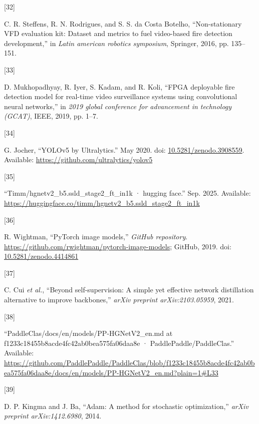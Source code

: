 \documentclass[
  10pt,
]{article}
\newlength{\cslhangindent}
\newlength{\csllabelwidth}
\newenvironment{CSLReferences}[2] %
 {\begin{list}{}{%
  \setlength{\itemindent}{0pt}
  \setlength{\leftmargin}{0pt}
  \setlength{\parsep}{0pt}
  \ifodd #1
   \setlength{\leftmargin}{\cslhangindent}
   \setlength{\itemindent}{-1\cslhangindent}
  \fi
  \setlength{\itemsep}{#2\baselineskip}}}
 {\end{list}}
\newcommand{\CSLLeftMargin}[1]{\parbox[t]{\csllabelwidth}{\strut#1\strut}}
\newcommand{\CSLRightInline}[1]{\parbox[t]{\linewidth - \csllabelwidth}{\strut#1\strut}}
\begin{document}
\begin{CSLReferences}{0}{0}
\CSLLeftMargin{{[}32{]} }%
\CSLRightInline{C. R. Steffens, R. N. Rodrigues, and S. S. da Costa
Botelho, {``Non-stationary VFD evaluation kit: Dataset and metrics to
fuel video-based fire detection development,''} in \emph{Latin american
robotics symposium}, Springer, 2016, pp. 135--151.}

\CSLLeftMargin{{[}33{]} }%
\CSLRightInline{D. Mukhopadhyay, R. Iyer, S. Kadam, and R. Koli, {``FPGA
deployable fire detection model for real-time video surveillance systems
using convolutional neural networks,''} in \emph{2019 global conference
for advancement in technology (GCAT)}, IEEE, 2019, pp. 1--7.}

\CSLLeftMargin{{[}34{]} }%
\CSLRightInline{G. Jocher, {``{YOLOv5 by Ultralytics}.''} May 2020. doi:
\href{https://doi.org/10.5281/zenodo.3908559}{10.5281/zenodo.3908559}.
Available: \url{https://github.com/ultralytics/yolov5}}

\CSLLeftMargin{{[}35{]} }%
\CSLRightInline{{``Timm/hgnetv2\_b5.ssld\_stage2\_ft\_in1k · hugging
face.''} Sep. 2025. Available:
\url{https://huggingface.co/timm/hgnetv2_b5.ssld_stage2_ft_in1k}}

\CSLLeftMargin{{[}36{]} }%
\CSLRightInline{R. Wightman, {``PyTorch image models,''} \emph{GitHub
repository}. \url{https://github.com/rwightman/pytorch-image-models};
GitHub, 2019. doi:
\href{https://doi.org/10.5281/zenodo.4414861}{10.5281/zenodo.4414861}}

\CSLLeftMargin{{[}37{]} }%
\CSLRightInline{C. Cui \emph{et al.}, {``Beyond self-supervision: A
simple yet effective network distillation alternative to improve
backbones,''} \emph{arXiv preprint arXiv:2103.05959}, 2021.}

\CSLLeftMargin{{[}38{]} }%
\CSLRightInline{{``PaddleClas/docs/en/models/PP-HGNetV2\_en.md at
f1233c18455b8acde4fc42ab0bea575fa06daa8e · PaddlePaddle/PaddleClas.''}
Available:
\url{https://github.com/PaddlePaddle/PaddleClas/blob/f1233c18455b8acde4fc42ab0bea575fa06daa8e/docs/en/models/PP-HGNetV2_en.md?plain=1\#L33}}

\CSLLeftMargin{{[}39{]} }%
\CSLRightInline{D. P. Kingma and J. Ba, {``Adam: A method for stochastic
optimization,''} \emph{arXiv preprint arXiv:1412.6980}, 2014.}


\end{CSLReferences}
\end{document}
